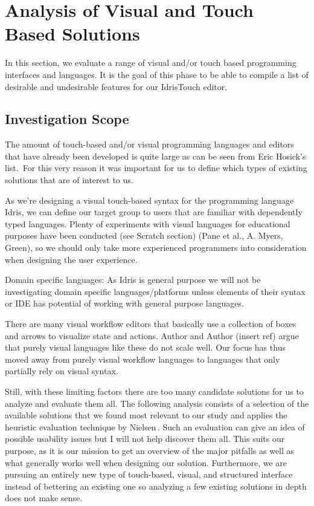 \section{Analysis of Visual and Touch Based Solutions}
\label{sec:Analysis}

In this section, we evaluate a range of visual and/or touch based programming interfaces and languages. It is the goal of this phase to be able to compile a list of desirable and undesirable features for our IdrisTouch editor.

\subsection{Investigation Scope}
The amount of touch-based and/or visual programming languages and editors that have already been developed is quite large as can be seen from Eric Hosick's list.\,\cite{hosick2014} For this very reason it was important for us to define which types of existing solutions that are of interest to us.

As we’re designing a visual touch-based syntax for the programming language Idris, we can define our target group to users that are familiar with dependently typed languages. Plenty of experiments with visual languages for educational purposes have been conducted (see Scratch section) (Pane et al., A. Myers, Green), so we should only take more experienced programmers into consideration when designing the user experience.

Domain specific languages: As Idris is general purpose we will not be investigating domain specific languages/platforms unless elements of their syntax or IDE has potential of working with general purpose languages.

There are many visual workflow editors that basically use a collection of boxes and arrows to visualize state and actions. Author and Author (insert ref) argue that purely visual languages like these do not scale well. Our focus has thus moved away from purely visual workflow languages to languages that only partially rely on visual syntax.

Still, with these limiting factors there are too many candidate solutions for us to analyze and evaluate them all. The following analysis consists of a selection of the available solutions that we found most relevant to our study and applies the heuristic evaluation technique by Nielsen\,\cite{nielsen1990heuristic}. Such an evaluation can give an idea of possible usability issues but I will not help discover them all. This suits our purpose, as it is our mission to get an overview of the major pitfalls as well as what generally works well when designing our solution. Furthermore, we are pursuing an entirely new type of touch-based, visual, and structured interface instead of bettering an existing one so analyzing a few existing solutions in depth does not make sense.

